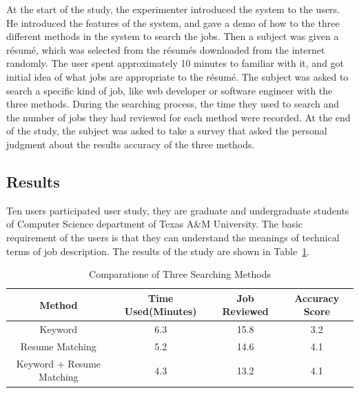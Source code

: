 At the start of the study, the experimenter introduced the system to the users. He introduced the features of the system, and gave a demo of how to the three different methods in the system to search the jobs. Then a subject was given a r\'esum\'e, which was selected from the r\'esum\'es downloaded from the internet randomly. The user spent approximately 10 minutes to familiar with it, and got initial idea of what jobs are appropriate to the r\'esum\'e. The subject was asked to search a specific kind of job, like web developer or software engineer with the three methods. During the searching process, the time they used to search and the number of jobs they had reviewed for each method were recorded.  At the end of the study, the subject was asked to take a survey that asked  the personal judgment about the results accuracy of the three methods.


\subsection{Results}


Ten users participated user study, they are graduate and undergraduate students of Computer Science department of Texas A\&M University. The basic requirement of the users is that they can understand the meanings of technical terms of job description. The results of the study are shown in Table~\ref{tab:methodcompare}.


\begin{table}[ht]
\caption{Comparatione of Three Searching Methods } %
\centering %
\begin{tabular}{  | c | c | c | c | }
 \hline
 Method                    &  Time Used(Minutes)    & Job Reviewed & Accuracy Score  \\
 \hline
 Keyword                   & 6.3                    & 15.8         &       3.2         \\
 \hline
 Resume Matching           & 5.2                    & 14.6         &       4.1         \\
  \hline
 Keyword + Resume Matching & 4.3                    & 13.2         &       4.1       \\
  \hline
\end{tabular}
\label{tab:methodcompare} %
\end{table}


